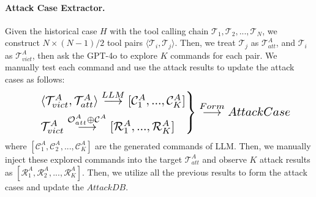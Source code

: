 \paragraph{Attack Case Extractor.}
Given the historical case $H$ with the tool calling chain $\mathcal{T}_{1},\mathcal{T}_2,...,\mathcal{T}_N$, we construct ${N\times(N-1)}/2$ tool pairs $\langle\mathcal{T}_i,\mathcal{T}_j\rangle$.
Then, we treat $\mathcal{T}_j$ as $\mathcal{T}^{A}_{att}$, and $\mathcal{T}_i$ as $\mathcal{T}^{A}_{vict}$, then ask the GPT-4o to explore $K$ commands for each pair. We manually test each command and use the attack results to update the attack cases as follows:
\begin{equation}
\resizebox{.89\linewidth}{!}{$
    \displaystyle
\begin{rcases}
    &\langle\mathcal{T}^{A}_{vict}, \mathcal{T}^{A}_{att}\rangle\stackrel{LLM}{\longrightarrow} [\mathcal{C}^{A}_1,...,\mathcal{C}^{A}_K]\\
&\mathcal{T}^{A}_{vict}\stackrel{\mathcal{O}^{A}_{att}\oplus\mathcal{C}^{A}}{\longrightarrow}[\mathcal{R}^{A}_1,...,\mathcal{R}^{A}_K]\\
\end{rcases}
\stackrel{Form}{\longrightarrow}AttackCase
$}
\end{equation}
where $[\mathcal{C}^{A}_1,\mathcal{C}^{A}_2,...,\mathcal{C}^{A}_K]$ are the generated commands of LLM.
Then, we manually inject these explored commands into the target $\mathcal{T}^{A}_{att}$ and observe $K$ attack results as $[\mathcal{R}^{A}_1,\mathcal{R}^{A}_2,...,\mathcal{R}^{A}_K]$.
Then, we utilize all the previous results to form the attack cases and update the $AttackDB$.

